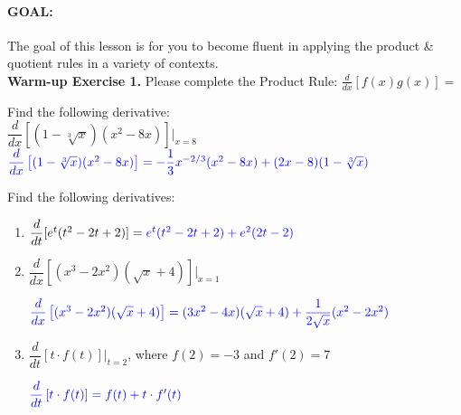 \documentclass[10pt]{article}
\begin{document}
\paragraph*{GOAL:} The goal of this lesson is for you to become fluent in applying the product \& quotient rules in a variety of contexts.\\

{\bf\color{blue}Warm-up Exercise 1.} Please complete the Product Rule: $\displaystyle \frac{d}{dx}[f(x)g(x)]=$   

{} Find the following derivative:\\

$\dfrac{d}{dx}\left[(1-\sqrt[3]{x})(x^2-8x)\right]\bigg|_{x=8}$\\

${\color{blue}\dfrac{d}{dx}\left[(1-\sqrt[3]{x})(x^2-8x)\right]=-\dfrac{1}{3}x^{-2/3}(x^2-8x)+(2x-8)(1-\sqrt[3]{x})}$


\vfill

{} Find the following derivatives:\\

\begin{enumerate}[label=(\alph*)]
\item$\dfrac{d}{dt}[e^t(t^2-2t+2)]={\color{blue}e^t(t^2-2t+2)+e^2(2t-2)}$

\vfill

\item $\dfrac{d}{dx}[(x^3-2x^2)(\sqrt{x}+4)]\bigg|_{x=1}$

${\color{blue}\dfrac{d}{dx}\left[(x^3-2x^2)(\sqrt{x}+4)\right]=(3x^2-4x)(\sqrt{x}+4)+\dfrac{1}{2\sqrt{x}}(x^2-2x^2)}$


\vfill
\vfill

\item $\dfrac{d}{dt}\left[ t\cdot f(t) \right]\bigg|_{t=2}$, where $f(2)=-3$ and $f'(2)=7$

${\color{blue}\dfrac{d}{dt}\left[ t\cdot f(t) \right]=f(t)+t\cdot f'(t)}$


\vfill
\vfill

\end{enumerate}
\end{document}
